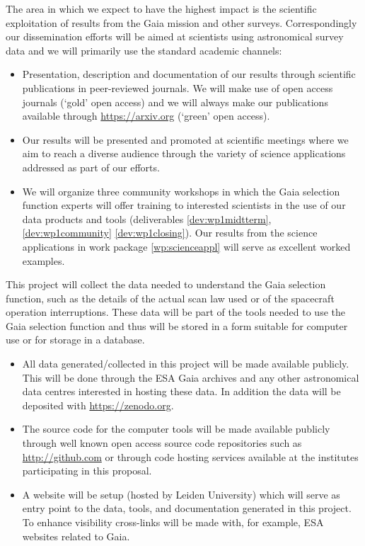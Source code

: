 The area in which we expect to have the highest impact is the scientific exploitation of results from the Gaia mission and other surveys. Correspondingly our dissemination efforts will be aimed at scientists using astronomical survey data and we will primarily use the standard academic channels:
\begin{itemize}
    \item Presentation, description and documentation of our results through scientific publications in peer-reviewed journals. We will make use of open access journals (`gold' open access) and we will always make our publications available through \url{https://arxiv.org} (`green' open access).
    \item Our results will be presented and promoted at scientific meetings where we aim to reach a diverse audience through the variety of science applications addressed as part of our efforts.
    \item We will organize three community workshops in which the Gaia selection function experts will offer training to interested scientists in the use of our data products and tools (deliverables \ref{dev:wp1midtterm}, \ref{dev:wp1community} \ref{dev:wp1closing}). Our results from the science applications in work package \ref{wp:scienceappl} will serve as excellent worked examples.
\end{itemize}

This project will collect the data needed to understand the Gaia selection function, such as the details of the actual scan law used or of the spacecraft operation interruptions. These data will be part of the tools needed to use the Gaia selection function and thus will be stored in a form suitable for computer use or for storage in a database.
\begin{itemize}
    \item All data generated/collected in this project will be made available publicly. This will be done through the ESA Gaia archives and any other astronomical data centres interested in hosting these data. In addition the data will be deposited with \url{https://zenodo.org}.
    \item The source code for the computer tools will be made available publicly through well known open access source code repositories such as \url{http://github.com} or through code hosting services available at the institutes participating in this proposal.
    \item A website will be setup (hosted by Leiden University) which will serve as entry point to the data, tools, and documentation generated in this project. To enhance visibility cross-links will be made with, for example, ESA websites related to Gaia.
\end{itemize}

